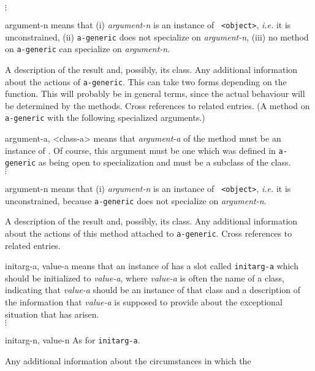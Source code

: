\begin{optDefinition}
\begin{genericargs}
    $\vdots$
    \item[argument-n] means that (i) {\em argument-n} is an instance of {\tt
        <object>}, {\em i.e.} it is unconstrained, (ii) {\tt a-generic} does not
    specialize on {\em argument-n}, (iii) no method on {\tt a-generic} can
    specialize on {\em argument-n}.
\end{genericargs}
%
\result%
A description of the result and, possibly, its class.
%
\remarks%
Any additional information about the actions of {\tt a-generic}.  This
can take two forms depending on the function.  This will probably be
in general terms, since the actual behaviour will be determined by the
methods.
%
\seealso%
Cross references to related entries.
%
%
(A method on {\tt a-generic} with the following specialized arguments.)
%
\begin{specargs}
    \item[argument-a, <class-a>] means that {\em argument-a} of the method must
    be an instance of {\tt <class-a>}.  Of course, this argument must be one
    which was defined in {\tt a-generic} as being open to
    specialization and {\tt <class-a>} must be a subclass of the class.\\
    $\vdots$
    \item[argument-n] means that (i) {\em argument-n} is an instance of {\tt
        <object>}, {\em i.e.} it is unconstrained, because {\tt a-generic} does
    not specialize on {\em argument-n}.
\end{specargs}
%
\result%
A description of the result and, possibly, its class.
%
\remarks%
Any additional information about the actions of this method attached
to {\tt a-generic}.
%
\seealso%
Cross references to related entries.
%
%
\begin{initoptions}
    \item[initarg-a, value-a] means that an instance of {\tt <a-condition>} has
    a slot called {\tt initarg-a} which should be initialized to {\em value-a},
    where {\em value-a} is often the name of a class, indicating that {\em
        value-a} should be an instance of that class and a description of the
    information that {\em value-a} is
    supposed to provide about the exceptional situation that has arisen.\\
    $\vdots$
    \item[initarg-n, value-n] As for {\tt initarg-a}.
\end{initoptions}
%
\remarks%
Any additional information about the circumstances in which the

\end{optDefinition}
